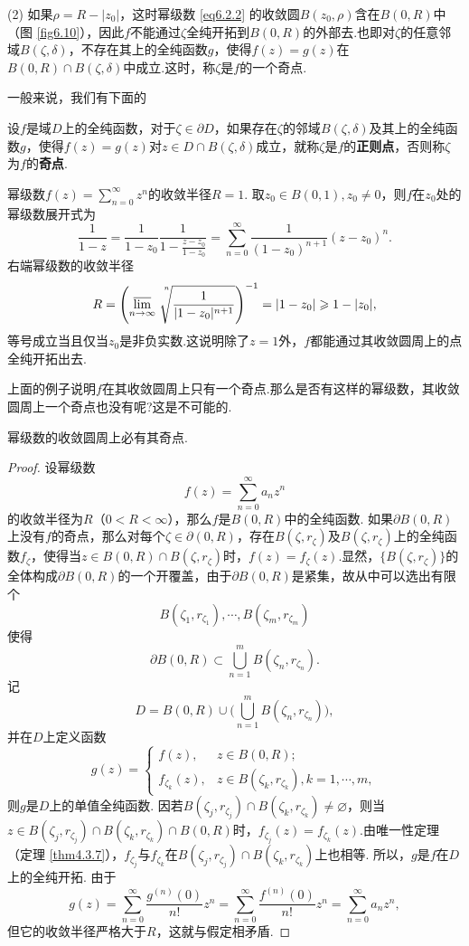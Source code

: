 (2) 如果$\rho=R-|z_0|$，这时幂级数 \eqref{eq6.2.2} 的收敛圆$B(z_0,\rho)$含在$B(0,R)$中（图 \ref{fig6.10}），因此$f$不能通过$\zeta$全纯开拓到$B(0,R)$的外部去.也即对$\zeta$的任意邻域$B(\zeta,\delta)$，不存在其上的全纯函数$g$，使得$f(z)=g(z)$在$B(0,R)\cap B(\zeta,\delta)$中成立.这时，称$\zeta$是$f$的一个奇点.

一般来说，我们有下面的
\begin{definition}
  设$f$是域$D$上的全纯函数，对于$\zeta\in\partial D$，如果存在$\zeta$的邻域$B(\zeta,\delta)$及其上的全纯函数$g$，使得$f(z)=g(z)$对$z\in D\cap B(\zeta,\delta)$成立，就称$\zeta$是$f$的\textbf{正则点}，否则称$\zeta$为$f$的\textbf{奇点}.
\end{definition}

\begin{example}\label{exam6.2.2}
  幂级数$f(z)=\sum_{n=0}^\infty z^n$的收敛半径$R=1$. 取$z_0\in B(0,1),z_0\ne0$，则$f$在$z_0$处的幂级数展开式为
  \[
    \frac1{1-z} = \frac1{1-z_0}\frac1{1-\frac{z-z_0}{1-z_0}}
    = \sum_{n=0}^\infty\frac1{(1-z_0)^{n+1}}(z-z_0)^n.
  \]
  右端幂级数的收敛半径
  \[
    R = \left(\varlimsup_{n\to\infty}\sqrt[\leftroot{-4}\uproot{20}n]{\frac1{|1-z_0|^{n+1}}}
    \right)^{-1}=|1-z_0|\ge1-|z_0|,
  \]
  等号成立当且仅当$z_0$是非负实数.这说明除了$z=1$外，$f$都能通过其收敛圆周上的点全纯开拓出去.
\end{example}

上面的例子说明$f$在其收敛圆周上只有一个奇点.那么是否有这样的幂级数，其收敛圆周上一个奇点也没有呢?这是不可能的.
\begin{theorem}\label{thm6.2.3}
  幂级数的收敛圆周上必有其奇点.
\end{theorem}
\begin{proof}
  设幂级数
  \[
    f(z) = \sum_{n=0}^\infty a_nz^n
  \]
  的收敛半径为$R$（$0<R<\infty$），那么$f$是$B(0,R)$中的全纯函数.
  如果$\partial B(0,R)$上没有$f$的奇点，那么对每个$\zeta\in\partial(0,R)$，存在$B(\zeta,r_\zeta)$及$B(\zeta,r_\zeta)$上的全纯函数$f_\zeta$，使得当$z\in B(0,R)\cap B(\zeta,r_\zeta)$时，$f(z)=f_\zeta(z)$.显然，$\{B(\zeta,r_\zeta)\}$的全体构成$\partial B(0,R)$的一个开覆盖，由于$\partial B(0,R)$是紧集，故从中可以选出有限个
  \[
    B(\zeta_1,r_{\zeta_1}),\cdots,B(\zeta_m,r_{\zeta_m})
  \]
  使得
  \[
    \partial B(0,R)\subset\bigcup_{n=1}^m B(\zeta_n,r_{\zeta_n}).
  \]
  记
  \[
    D = B(0,R)\cup\big(\bigcup_{n=1}^mB(\zeta_n,r_{\zeta_n})\big),
  \]
  并在$D$上定义函数
  \[
    g(z) = \begin{cases}
      f(z), & z \in B(0,R);\\
      f_{\zeta_k}(z), & z\in B(\zeta_k,r_{\zeta_k}),k=1,\cdots,m,
     \end{cases}
  \]
  则$g$是$D$上的单值全纯函数. 因若$B(\zeta_j,r_{\zeta_j})\cap B(\zeta_k,r_{\zeta_k})
  \ne\varnothing$，则当$z\in B(\zeta_j,r_{\zeta_j})\cap B(\zeta_k,r_{\zeta_k})\cap B(0,R)$时，$f_{\zeta_j}(z)=f_{\zeta_k}(z)$.由唯一性定理（定理 \ref{thm4.3.7}），$f_{\zeta_j}$与$f_{\zeta_k}$在$B(\zeta_j,r_{\zeta_j})\cap B(\zeta_k,r_{\zeta_k})$上也相等. 所以，$g$是$f$在$D$上的全纯开拓. 由于
  \[
    g(z) = \sum_{n=0}^\infty \frac{g^{(n)}(0)}{n!}z^n = \sum_{n=0}^\infty
    \frac{f^{(n)}(0)}{n!}z^n=\sum_{n=0}^\infty a_nz^n,
  \]
  但它的收敛半径严格大于$R$，这就与假定相矛盾.
\end{proof}

